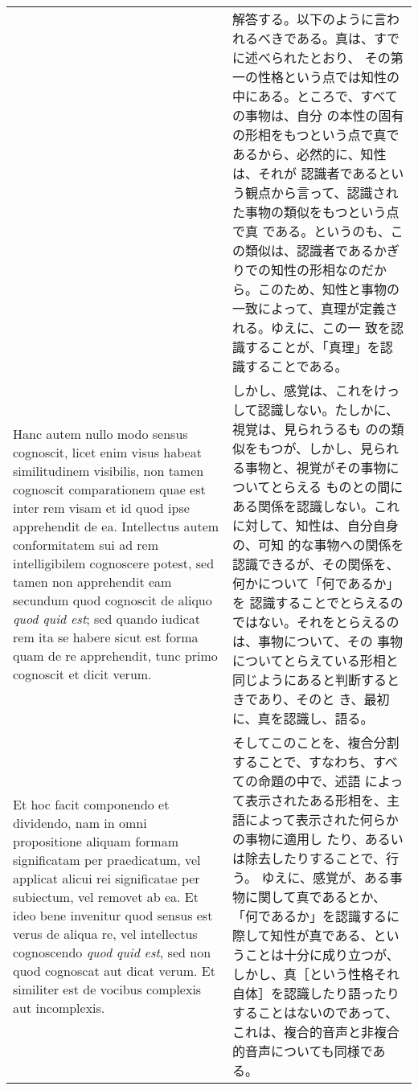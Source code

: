 \documentclass[10pt]{jsarticle} %
\begin{document}
\begin{longtable}{p{21em}p{21em}}
& 

解答する。以下のように言われるべきである。真は、すでに述べられたとおり、
その第一の性格という点では知性の中にある。ところで、すべての事物は、自分
の本性の固有の形相をもつという点で真であるから、必然的に、知性は、それが
認識者であるという観点から言って、認識された事物の類似をもつという点で真
である。というのも、この類似は、認識者であるかぎりでの知性の形相なのだか
ら。このため、知性と事物の一致によって、真理が定義される。ゆえに、この一
致を認識することが、「真理」を認識することである。


\\


Hanc autem nullo modo sensus cognoscit, licet enim visus
habeat similitudinem visibilis, non tamen cognoscit comparationem quae
est inter rem visam et id quod ipse apprehendit de ea. Intellectus autem
conformitatem sui ad rem intelligibilem cognoscere potest, sed tamen non
apprehendit eam secundum quod cognoscit de aliquo {\itshape quod quid est}; sed
quando iudicat rem ita se habere sicut est forma quam de re apprehendit,
tunc primo cognoscit et dicit verum. 


&

しかし、感覚は、これをけっして認識しない。たしかに、視覚は、見られうるも
のの類似をもつが、しかし、見られる事物と、視覚がその事物についてとらえる
ものとの間にある関係を認識しない。これに対して、知性は、自分自身の、可知
的な事物への関係を認識できるが、その関係を、何かについて「何であるか」を
認識することでとらえるのではない。それをとらえるのは、事物について、その
事物についてとらえている形相と同じようにあると判断するときであり、そのと
き、最初に、真を認識し、語る。


\\


Et hoc facit componendo et dividendo, nam in omni propositione aliquam
formam significatam per praedicatum, vel applicat alicui rei
significatae per subiectum, vel removet ab ea. Et ideo bene invenitur
quod sensus est verus de aliqua re, vel intellectus cognoscendo
{\itshape quod quid est}, sed non quod cognoscat aut dicat verum. Et
similiter est de vocibus complexis aut incomplexis. 


&

そしてこのことを、複合分割することで、すなわち、すべての命題の中で、述語
によって表示されたある形相を、主語によって表示された何らかの事物に適用し
たり、あるいは除去したりすることで、行う。
ゆえに、感覚が、ある事物に関して真であるとか、「何であるか」を認識するに際して知性が真である、ということは十分に成り立つが、しかし、真［という性格それ自体］を認識したり語ったりすることはないのであって、これは、複合的音声と非複合的音声についても同様である。


\end{longtable}
\end{document}
